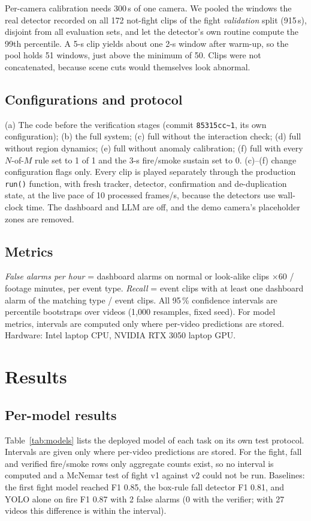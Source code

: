 \documentclass[conference]{IEEEtran}
\begin{document}
Per-camera calibration needs 300\,s of one camera. We pooled the windows the real detector recorded on all 172 not-fight clips of the fight \emph{validation} split (915\,s), disjoint from all evaluation sets, and let the detector's own routine compute the 99th percentile. A 5-s clip yields about one 2-s window after warm-up, so the pool holds 51 windows, just above the minimum of 50. Clips were not concatenated, because scene cuts would themselves look abnormal.

\subsection{Configurations and protocol}
(a) The code before the verification stages (commit \texttt{85315cc\textasciitilde1}, its own configuration); (b) the full system; (c) full without the interaction check; (d) full without region dynamics; (e) full without anomaly calibration; (f) full with every $N$-of-$M$ rule set to 1 of 1 and the 3-s fire/smoke sustain set to 0. (c)--(f) change configuration flags only. Every clip is played separately through the production \texttt{run()} function, with fresh tracker, detector, confirmation and de-duplication state, at the live pace of 10 processed frames/s, because the detectors use wall-clock time. The dashboard and LLM are off, and the demo camera's placeholder zones are removed.

\subsection{Metrics}
\emph{False alarms per hour} = dashboard alarms on normal or look-alike clips $\times 60$ / footage minutes, per event type. \emph{Recall} = event clips with at least one dashboard alarm of the matching type / event clips. All 95\,\% confidence intervals are percentile bootstraps over videos (1{,}000 resamples, fixed seed). For model metrics, intervals are computed only where per-video predictions are stored. Hardware: Intel laptop CPU, NVIDIA RTX 3050 laptop GPU.

\section{Results}
\subsection{Per-model results}
Table~\ref{tab:models} lists the deployed model of each task on its own test protocol. Intervals are given only where per-video predictions are stored. For the fight, fall and verified fire/smoke rows only aggregate counts exist, so no interval is computed and a McNemar test of fight v1 against v2 could not be run. Baselines: the first fight model reached F1 0.85, the box-rule fall detector F1 0.81, and YOLO alone on fire F1 0.87 with 2 false alarms (0 with the verifier; with 27 videos this difference is within the interval).
\end{document}
